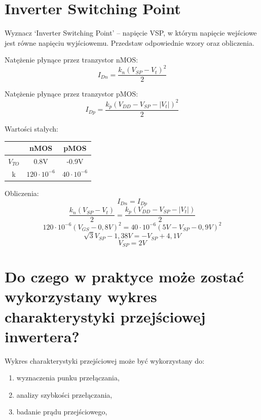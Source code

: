 \documentclass[a4paper, 11pt]{article}
\begin{document}
\section{Inverter Switching Point}\label{sec:nverter_switching_point} %
Wyznacz ‘Inverter Switching Point’ – napięcie VSP, w którym napięcie wejściowe jest równe napięciu
wyjściowemu. Przedstaw odpowiednie wzory oraz obliczenia.

Natężenie płynące przez tranzystor nMOS:
\[
	I_{Dn} = \frac{k_n \left( V_{SP}-V_{t} \right)^2 }{2}
\]

Natężenie płynące przez tranzystor pMOS:
\[
	I_{Dp} = \frac{k_p \left( V_{DD}-V_{SP}-|V_{t}| \right)^2 }{2}
\]

Wartości stałych:

\begin{center}
	\begin{tabular}{c | c | c }
		         & nMOS              & pMOS             \\
		\hline
		$V_{TO}$ & 0.8V              & -0.9V            \\
		k        & $120\cdot10^{-6}$ & $40\cdot10^{-6}$ \\
	\end{tabular}
\end{center}

\pagebreak
Obliczenia:
\[
	I_{Dn} = I_{Dp}
\]
\[
	\frac{k_n \left( V_{SP}-V_{t} \right) }{2} = \frac{k_p \left( V_{DD}-V_{SP}-|V_{t}| \right) }{2}
\]
\[
	120\cdot10^{-6}\left(V_{GS}-0,8V\right)^2 = 40\cdot10^{-6}\left(5V-V_{SP}-0,9V\right)^2
\]
\[
	\sqrt{3}V_{SP}-1,38V = -V_{SP} + 4,1V
\]
\[
	V_{SP} = 2V
\]



\section{Do czego w praktyce może zostać wykorzystany wykres charakterystyki przejściowej inwertera?}\label{sec:} %

Wykres charakterystyki przejściowej może być wykorzystany do:

\begin{enumerate}
	\item wyznaczenia punku przełączania,
	\item analizy szybkości przełączania,
	\item badanie prądu przejściowego,
\end{enumerate}


\end{document}
